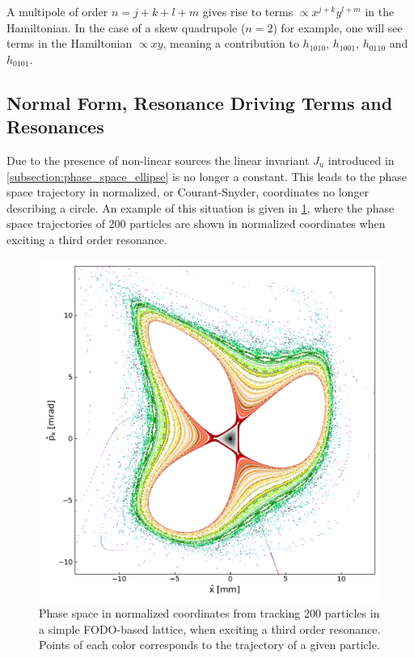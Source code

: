 A multipole of order \(n = j + k + l + m\) gives rise to terms \(\propto x^{j+k} y^{l+m}\) in the Hamiltonian.
In the case of a skew quadrupole (\(n=2\)) for example, one will see terms in the Hamiltonian \(\propto xy\), meaning a contribution to \(h_{1010}\), \(h_{1001}\), \(h_{0110}\) and \(h_{0101}\).

\subsection{Normal Form, Resonance Driving Terms and Resonances}
\label{subsection:normal_form_and_rdt}

Due to the presence of non-linear sources the linear invariant \(J_u\) introduced in \cref{subsection:phase_space_ellipse} is no longer a constant.
This leads to the phase space trajectory in normalized, or Courant-Snyder, coordinates no longer describing a circle.
An example of this situation is given in \cref{figure:phase_space_third_order_resonance}, where the phase space trajectories of \num{200} particles are shown in normalized coordinates when exciting a third order resonance.

\begin{figure}[!htb]
    \begin{center}
    \includegraphics[width = 0.9\linewidth]{Figures/Beam_Dynamics_Theory/phase_space_third_order_resonance.pdf}
    \caption{Phase space in normalized coordinates from tracking \num{200} particles in a simple FODO-based lattice, when exciting a third order resonance. Points of each color corresponds to the trajectory of a given particle.}
    \label{figure:phase_space_third_order_resonance}
    \end{center}
\end{figure}

